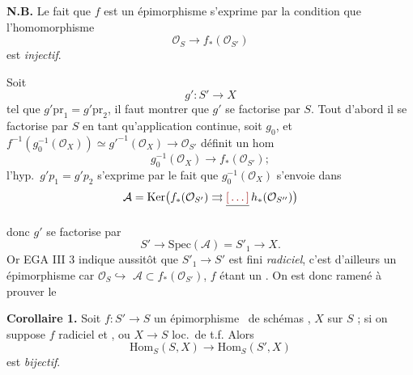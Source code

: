 \documentclass[11pt,a4paper]{article}
\begin{document}

\textbf{N.B.} Le fait que $f$ est un épimorphisme s'exprime par la
condition que l'homomorphisme
\[
  \mathcal{O}_S \longrightarrow f_*(\mathcal{O}_{S'})
\]
est \emph{injectif}.

Soit
\[
  g' : S' \longrightarrow X
\]
tel que $g' \mathrm{pr}_1 = g' \mathrm{pr}_2$, il faut montrer que $g'$ se
factorise par $S$. Tout d'abord il se factorise par $S$ en tant
qu'application continue, soit $g_0$, et
$f^{-1}(g_0^{-1}(\mathcal{O}_X)) \simeq g'^{-1}(\mathcal{O}_X) \to
\mathcal{O}_{S'}$ définit un hom
\[
  g_0^{-1}(\mathcal{O}_X) \longrightarrow f_*(\mathcal{O}_{S'}) ;
\]
l'hyp.\ $g' p_1 = g' p_2$ s'exprime par le fait que
$g_0^{-1}(\mathcal{O}_X)$ s'envoie dans
\[
  \mathcal{A} = \mathrm{Ker}\bigl(f_*(\mathcal{O}_{S'}) \rightrightarrows
  \struck{\ill{}}\, h_*(\mathcal{O}_{S''})\bigr)
\]



donc $g'$ se factorise par
\[
  S' \longrightarrow \mathrm{Spec}(\mathcal{A}) = S'_1 \longrightarrow X .
\]
Or EGA III 3 indique aussitôt que $S'_1 \to S'$ est fini
\emph{radiciel}, c'est d'ailleurs un épimorphisme car
$\mathcal{O}_S \hookrightarrow$ 
$\mathcal{A} \subset f_*(\mathcal{O}_{S'})$, $f$ étant un
. On est donc ramené à prouver le

\textbf{Corollaire 1.} Soit $f : S' \to S$ un épimorphisme
\ de schémas , $X$
  sur $S$ ;  si on suppose $f$
  radiciel et ,
ou $X \to S$ loc.\ de t.f. Alors
\[
  \mathrm{Hom}_S(S, X) \longrightarrow \mathrm{Hom}_S(S', X)
\]
est \emph{bijectif}.
\end{document}
